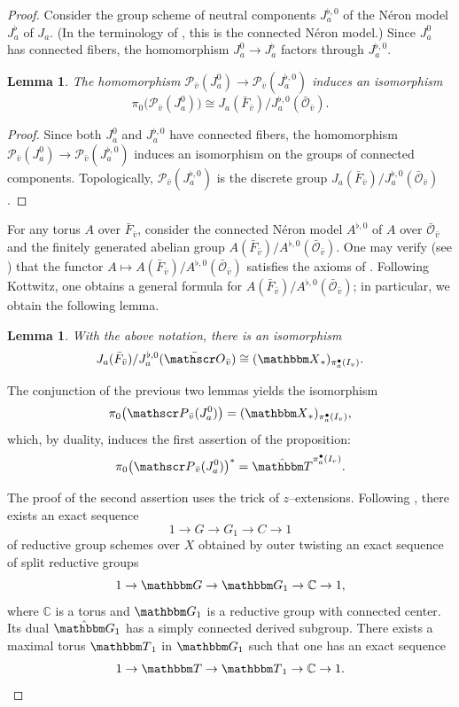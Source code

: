 \documentclass[12pt,english]{smfart}
\numberwithin{equation}{subsection}
\newtheorem{lemma}[equation]{Lemma}
\theoremstyle{remark}
\newcommand\calP{{\mathscr P}}
\newcommand\calO{{\mathscr O}}
\newcommand\GG{{\mathbbm G}}
\newcommand\bbT{{\mathbbm T}}
\newcommand\bbG{{\mathbbm G}}
\newcommand\bbX{{\mathbbm X}}
\begin{document}
\begin{proof}
Consider the group scheme of neutral components $J_a^{\flat,0}$ of the N\'eron model $J_a^\flat$ of $J_a$. (In the terminology of \cite{BLR}, this is the connected N\'eron model.) Since $J_a^0$ has connected fibers, the homomorphism $J_a^0\to J_a^\flat$ factors through $J_a^{\flat,0}$.

\begin{lemma}
The homomorphism $\calP_{\bar v}(J_a^0) \to \calP_{\bar v}(J_a^{\flat,0})$ induces an isomorphism
$$
\pi_0\bigl(\calP_{\bar v}(J_a^0)\bigr) \cong J_a(\bar F_{\bar v})/J_a^{\flat,0}(\bar\calO_{\bar v}).
$$
\end{lemma}

\begin{proof}
Since both $J_a^0$ and $J_a^{\flat,0}$ have connected fibers, the homomorphism $\calP_{\bar v}(J_a^0) \to \calP_{\bar v}(J_a^{\flat,0})$ induces an isomorphism on the groups of connected components. Topologically, $\calP_{\bar v}(J_a^{\flat,0})$ is the discrete group $J_a(\bar F_{\bar v})/J_a^{\flat,0}(\bar\calO_{\bar v})$.
\end{proof}

For any torus $A$ over $\bar F_{\bar v}$, consider the connected N\'eron model $A^{\flat,0}$ of $A$ over $\bar\calO_{\bar v}$ and the finitely generated abelian group $A(\bar F_{\bar v})/A^{\flat,0}(\bar\calO_{\bar v})$. One may verify (see \cite{Ra}) that the functor $A\mapsto A(\bar F_{\bar v})/A^{\flat,0}(\bar\calO_{\bar v})$ satisfies the axioms of \cite[Lemma 2.2]{K-Iso1}. Following Kottwitz, one obtains a general formula for $A(\bar F_{\bar v})/A^{\flat,0}(\bar\calO_{\bar v})$; in particular, we obtain the following lemma.

\begin{lemma}\label{Kottwitz local}
With the above notation, there is an isomorphism
$$
J_a(\bar F_{\bar v})/J_a^{\flat,0}(\bar\calO_{\bar v}) \cong (\bbX_*)_{\pi_a^\bullet(I_v)}.
$$
\end{lemma}

The conjunction of the previous two lemmas yields the isomorphism
$$
\pi_0\bigl(\calP_{\bar v}(J_a^0)\bigr) = (\bbX_*)_{\pi_a^\bullet(I_v)},
$$
which, by duality, induces the first assertion of the proposition:
$$
\pi_0\bigl(\calP_{\bar v}(J_a^0)\bigr)^* = \hat{\bbT}^{\pi_a^\bullet(I_v)}.
$$

The proof of the second assertion uses the trick of $z$--extensions. Following \cite[7.5]{K-EST}, there exists an exact sequence
$$
1\rightarrow G\rightarrow G_1\rightarrow C\rightarrow 1
$$
of reductive group schemes over $X$ obtained by outer twisting an exact sequence of split reductive groups
$$
1\rightarrow \GG\rightarrow \GG_1\rightarrow \mathbb{C}\rightarrow 1,
$$
where $\mathbb{C}$ is a torus and $\GG_1$ is a reductive group with connected center. Its dual $\hat{\bbG}_1$ has a simply connected derived subgroup. There exists a maximal torus $\bbT_1$ in $\GG_1$ such that one has an exact sequence
$$
1\rightarrow \bbT\rightarrow \bbT_1\rightarrow \mathbb{C}\rightarrow 1.
$$


\end{proof}
\end{document}
